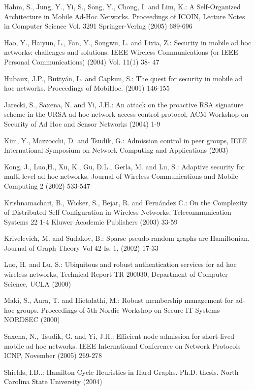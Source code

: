 \documentclass{article}
\begin{document}
\begin{thebibliography}{10}
 Hahm, S., Jung, Y.,
Yi, S., Song, Y., Chong, I. and Lim, K.: A Self-Organized
Architecture in Mobile Ad-Hoc Networks. Proceedings of ICOIN,
Lecture Notes in Computer Science Vol.  3291
  Springer-Verlag (2005)  689-696
  
 Hao, Y., Haiyun, L., Fan, Y., Songwu, L. and Lixia, Z.: Security in mobile ad hoc networks: challenges and solutions. IEEE Wireless Communications (or IEEE Personal Communications) (2004) Vol. 11(1) 38- 47

Hubaux, J.P., Butty{\'a}n, L. and Capkun, S.: The quest for security
in mobile ad hoc networks. Proceedings of MobiHoc. (2001)  146-155

Jarecki, S.,  Saxena, N. and Yi,  J.H.: An attack on the proactive
RSA signature scheme in the URSA ad hoc network access
control protocol,  ACM Workshop on Security of Ad Hoc and Sensor Networks (2004) 1-9

Kim, Y.,  Mazzocchi, D. and Tsudik, G.: Admission control in
peer groups, IEEE International Symposium on Network
Computing and Applications (2003)

Kong, J., Luo,H., Xu, K., Gu, D.L., Gerla, M. and Lu, S.: Adaptive
security for multi-level ad-hoc networks, Journal of Wireless
Communications and Mobile Computing 2 (2002)
533-547 

 Krishnamachari, B.,  Wicker, S.,  Bejar, R. and Fern{\'a}ndez C.: On the Complexity of Distributed Self-Configuration in Wireless Networks, Telecommunication Systems 22 1-4 Kluwer Academic Publishers (2003) 33-59 

 Krivelevich, M. and Sudakov, B.: Sparse pseudo-random graphs are Hamiltonian. Journal of Graph Theory Vol 42 Is. 1,  (2002) 17-33

Luo, H. and Lu, S.: Ubiquitous and robust authentication
services for ad hoc wireless networks, Technical Report
TR-200030, Department of Computer Science, UCLA (2000)

Maki, S., Aura, T. and Hietalathi, M.: Robust membership management
for ad-hoc groups. Proceedings of 5th Nordic Workshop on Secure IT
Systems NORDSEC (2000)

Saxena, N., Tsudik, G. and Yi, J.H.: Efficient node admission for
short-lived mobile ad hoc networks.  IEEE International Conference
on Network Protocols ICNP,  November (2005) 269-278

 Shields, I.B..: Hamilton Cycle Heuristics in Hard Graphs. Ph.D. thesis. North Carolina State University (2004)


\end{thebibliography}
\end{document}
